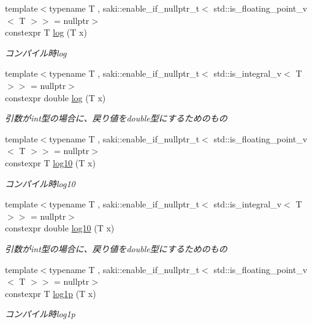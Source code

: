\begin{DoxyCompactItemize}
{\footnotesize template$<$typename T , saki\+::enable\+\_\+if\+\_\+nullptr\+\_\+t$<$ std\+::is\+\_\+floating\+\_\+point\+\_\+v$<$ T $>$$>$  = nullptr$>$ }\\constexpr T \mbox{\hyperlink{namespacesaki_a64136b916afd50ceb9bfb93ae12c63fb}{log}} (T x)
\begin{DoxyCompactList}\small\item\em コンパイル時log \end{DoxyCompactList}\item 
{\footnotesize template$<$typename T , saki\+::enable\+\_\+if\+\_\+nullptr\+\_\+t$<$ std\+::is\+\_\+integral\+\_\+v$<$ T $>$$>$  = nullptr$>$ }\\constexpr double \mbox{\hyperlink{namespacesaki_a7f260fd4311e2bd21ae770f8aed6fa81}{log}} (T x)
\begin{DoxyCompactList}\small\item\em 引数がint型の場合に、戻り値をdouble型にするためのもの \end{DoxyCompactList}\item 
{\footnotesize template$<$typename T , saki\+::enable\+\_\+if\+\_\+nullptr\+\_\+t$<$ std\+::is\+\_\+floating\+\_\+point\+\_\+v$<$ T $>$$>$  = nullptr$>$ }\\constexpr T \mbox{\hyperlink{namespacesaki_aa1a5f3dfe15009e9e985b8b0647211e6}{log10}} (T x)
\begin{DoxyCompactList}\small\item\em コンパイル時log10 \end{DoxyCompactList}\item 
{\footnotesize template$<$typename T , saki\+::enable\+\_\+if\+\_\+nullptr\+\_\+t$<$ std\+::is\+\_\+integral\+\_\+v$<$ T $>$$>$  = nullptr$>$ }\\constexpr double \mbox{\hyperlink{namespacesaki_a7e5fde452567de6eaae1d5c481497757}{log10}} (T x)
\begin{DoxyCompactList}\small\item\em 引数がint型の場合に、戻り値をdouble型にするためのもの \end{DoxyCompactList}\item 
{\footnotesize template$<$typename T , saki\+::enable\+\_\+if\+\_\+nullptr\+\_\+t$<$ std\+::is\+\_\+floating\+\_\+point\+\_\+v$<$ T $>$$>$  = nullptr$>$ }\\constexpr T \mbox{\hyperlink{namespacesaki_ae0b2550b674acc69fa1fbe407917fdc7}{log1p}} (T x)
\begin{DoxyCompactList}\small\item\em コンパイル時log1p \end{DoxyCompactList}\item 

\end{DoxyCompactItemize}
